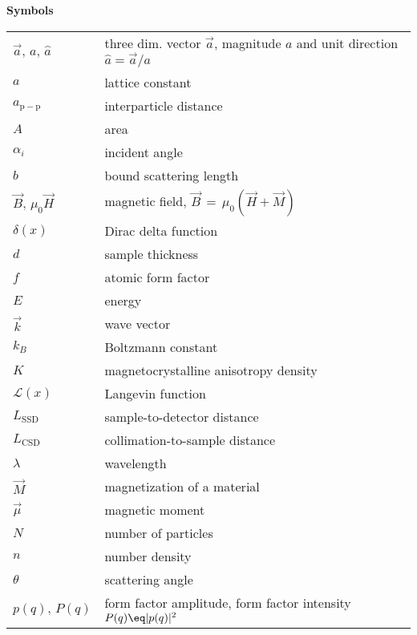 \documentclass[\main/dresen_thesis.tex]{subfiles}
\begin{document}
	\noindent \textbf{Symbols}
	\begin{table}[H]
      \begin{tabular}{p{3cm}l}
        $\vec{a} ,\, a ,\, \hat{a}$     & three dim. vector \ensuremath{\vec{a}}, magnitude \ensuremath{a} and unit direction $\hat{a} = \vec{a}/a$ \\
        $a$                         & lattice constant\\
        $a_\mathrm{p-p}$             & interparticle distance\\
        $A$                         & area\\
        $\alpha_i$                  & incident angle \\
        $b$                         & bound scattering length\\
        $\vec{B},\, \mu_0 \vec{H}$  & magnetic field, $\vec{B} \, = \, \mu_0 (\vec{H} + \vec{M})$ \\
        $\delta(x)$                 & Dirac delta function \\
        $d$                         & sample thickness\\
        $f$                         & atomic form factor\\
        $E$                         & energy\\
        $\vec{k}$                   & wave vector\\
        $k_B$                       & Boltzmann constant\\
        $K$                         & magnetocrystalline anisotropy density\\
        $\mathcal{L}(x)$            & Langevin function\\
        $L_\mathrm{SSD}$            & sample-to-detector distance \\
        $L_\mathrm{CSD}$            & collimation-to-sample distance \\
        $\lambda$                   & wavelength \\
        $\vec{M}$                   & magnetization of a material\\
        $\vec{\mu}$                 & magnetic moment \\
        $N$                         & number of particles\\
        $n$                         & number density\\
        $\theta$                    & scattering angle \\
        $p(q),\, P(q)$              & form factor amplitude, form factor intensity $P(q) \eq |p(q)|^2$ \\

\end{tabular}
\end{table}
\end{document}
